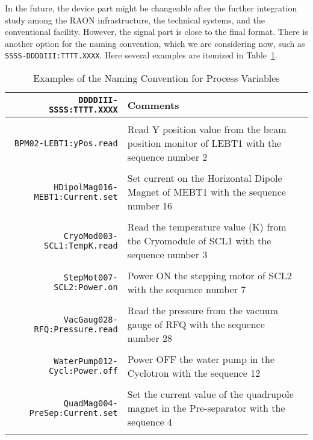 \documentclass[11pt
  , a4paper
  , article
  , oneside
]{memoir}
\begin{document}
In the future, the device part might be changeable after the further integration study among the RAON infrastructure, the technical systems, and the conventional facility. However, the signal part is close to the final format. There is another option for the naming convention, which we are considering now, such as \texttt{SSSS-DDDDIII:TTTT.XXXX}. Here several examples are itemized in Table~\ref{table:naming_convention}.
\begin{table}[!bt]
\caption{Examples of the Naming Convention for Process Variables}
\label{table:naming_convention}
\centering
\begin{tabular}{r|p{7.2cm}l} 
\toprule 
\texttt{DDDDIII-SSSS:TTTT.XXXX} &Comments\\ 
\midrule
&\\
\texttt{BPM02-LEBT1:yPos.read}          & Read Y position value from the beam position monitor of LEBT1 with the sequence number 2\\
&\\
\texttt{HDipolMag016-MEBT1:Current.set} & Set current on the Horizontal Dipole Magnet of MEBT1 with the sequence number 16\\
&\\
\texttt{CryoMod003-SCL1:TempK.read}     & Read the temperature value (K) from the Cryomodule of SCL1 with the sequence number 3\\
&\\
\texttt{StepMot007-SCL2:Power.on}       & Power ON the stepping motor of SCL2 with the sequence number 7\\
&\\
\texttt{VacGaug028-RFQ:Pressure.read}   & Read the pressure from the vacuum gauge of RFQ with the sequence number 28\\
&\\
\texttt{WaterPump012-Cycl:Power.off}    & Power OFF the water pump in the Cyclotron with the sequence 12\\
&\\
\texttt{QuadMag004-PreSep:Current.set}  & Set the current value of the quadrupole magnet in the Pre-separator with the sequence 4\\
&\\
\bottomrule
\end{tabular}
\end{table}



\clearpage
%
%
%

%

\end{document}
